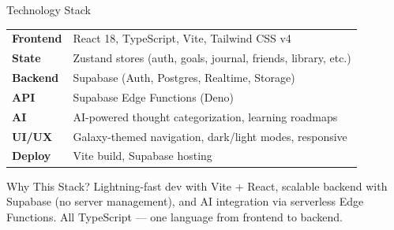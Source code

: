 \documentclass[aspectratio=43, 11pt]{beamer}
\begin{document}
\begin{frame}{\textcolor{StarGold}{Technology Stack}}

  \centering
  \vspace{0.3cm}
  \begin{tabular}{ll}
    \textcolor{Corona}{\textbf{Frontend}} & React 18, TypeScript, Vite, Tailwind CSS v4 \\
    \textcolor{Corona}{\textbf{State}} & Zustand stores (auth, goals, journal, friends, library, etc.) \\
    \textcolor{NebulaPurple}{\textbf{Backend}} & Supabase (Auth, Postgres, Realtime, Storage) \\
    \textcolor{NebulaPurple}{\textbf{API}} & Supabase Edge Functions (Deno) \\
    \textcolor{NebulaTeal}{\textbf{AI}} & AI-powered thought categorization, learning roadmaps \\
    \textcolor{StarGold}{\textbf{UI/UX}} & Galaxy-themed navigation, dark/light modes, responsive \\
    \textcolor{StarGold}{\textbf{Deploy}} & Vite build, Supabase hosting \\
  \end{tabular}

  \vspace{0.6cm}
  \begin{alertblock}{\textcolor{SunGlow}{Why This Stack?}}
    \small
    Lightning-fast dev with Vite + React, scalable backend with Supabase (no server management), and AI integration via serverless Edge Functions. All TypeScript --- one language from frontend to backend.
  \end{alertblock}
\end{frame}
\end{document}

